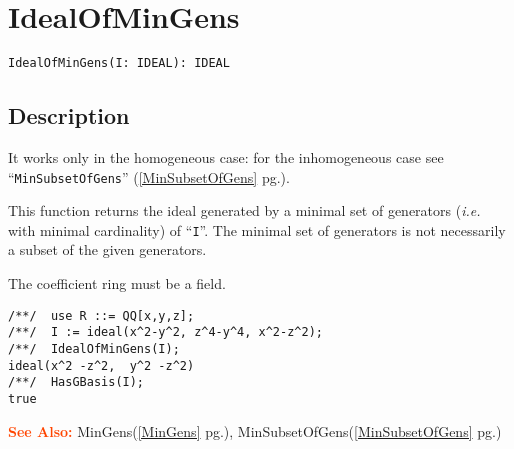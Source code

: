 \documentclass[a4paper]{mybook}
\newenvironment{command}{}{} %
\newcommand\SeeAlso{\par\textcolor{OrangeRed}{\textbf{\large See Also: }}}
\begin{document}
\section{IdealOfMinGens}
\label{IdealOfMinGens}
\begin{command} %


\begin{Verbatim}[label=syntax, rulecolor=\color{MidnightBlue},
frame=single]
IdealOfMinGens(I: IDEAL): IDEAL
\end{Verbatim}


\subsection*{Description}

It works only in the homogeneous case:
for the inhomogeneous case see ``\verb&MinSubsetOfGens&'' (\ref{MinSubsetOfGens} pg.\pageref{MinSubsetOfGens}).
\par 
This function returns the ideal generated by a minimal set of generators
(\textit{i.e.} with minimal cardinality) of ``\verb&I&''.  
The minimal set of generators is not necessarily a subset of the given
generators.
\par 
The coefficient ring must be a field.
\begin{Verbatim}[label=example, rulecolor=\color{PineGreen}, frame=single]
/**/  use R ::= QQ[x,y,z];
/**/  I := ideal(x^2-y^2, z^4-y^4, x^2-z^2);
/**/  IdealOfMinGens(I);
ideal(x^2 -z^2,  y^2 -z^2)
/**/  HasGBasis(I);
true
\end{Verbatim}


\SeeAlso %
  MinGens(\ref{MinGens} pg.\pageref{MinGens}), 
    MinSubsetOfGens(\ref{MinSubsetOfGens} pg.\pageref{MinSubsetOfGens})
\end{command} %
\end{document}
